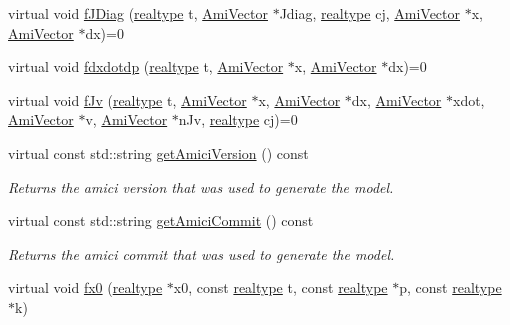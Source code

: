\begin{DoxyCompactItemize}
\item 
virtual void \mbox{\hyperlink{classamici_1_1_abstract_model_a6cf54c0a48ef223795655bdd44a339b7}{f\+J\+Diag}} (\mbox{\hyperlink{namespaceamici_a1bdce28051d6a53868f7ccbf5f2c14a3}{realtype}} t, \mbox{\hyperlink{classamici_1_1_ami_vector}{Ami\+Vector}} $\ast$Jdiag, \mbox{\hyperlink{namespaceamici_a1bdce28051d6a53868f7ccbf5f2c14a3}{realtype}} cj, \mbox{\hyperlink{classamici_1_1_ami_vector}{Ami\+Vector}} $\ast$x, \mbox{\hyperlink{classamici_1_1_ami_vector}{Ami\+Vector}} $\ast$dx)=0
\item 
virtual void \mbox{\hyperlink{classamici_1_1_abstract_model_a7ce1e14d4137c249bc44e18345b562b8}{fdxdotdp}} (\mbox{\hyperlink{namespaceamici_a1bdce28051d6a53868f7ccbf5f2c14a3}{realtype}} t, \mbox{\hyperlink{classamici_1_1_ami_vector}{Ami\+Vector}} $\ast$x, \mbox{\hyperlink{classamici_1_1_ami_vector}{Ami\+Vector}} $\ast$dx)=0
\item 
virtual void \mbox{\hyperlink{classamici_1_1_abstract_model_ae08b9d7a7d15898e4dd7c71ac057c6a5}{f\+Jv}} (\mbox{\hyperlink{namespaceamici_a1bdce28051d6a53868f7ccbf5f2c14a3}{realtype}} t, \mbox{\hyperlink{classamici_1_1_ami_vector}{Ami\+Vector}} $\ast$x, \mbox{\hyperlink{classamici_1_1_ami_vector}{Ami\+Vector}} $\ast$dx, \mbox{\hyperlink{classamici_1_1_ami_vector}{Ami\+Vector}} $\ast$xdot, \mbox{\hyperlink{classamici_1_1_ami_vector}{Ami\+Vector}} $\ast$v, \mbox{\hyperlink{classamici_1_1_ami_vector}{Ami\+Vector}} $\ast$n\+Jv, \mbox{\hyperlink{namespaceamici_a1bdce28051d6a53868f7ccbf5f2c14a3}{realtype}} cj)=0
\item 
virtual const std\+::string \mbox{\hyperlink{classamici_1_1_abstract_model_ae1d68e13dc35252f74b0a1f2601cd453}{get\+Amici\+Version}} () const
\begin{DoxyCompactList}\small\item\em Returns the amici version that was used to generate the model. \end{DoxyCompactList}\item 
virtual const std\+::string \mbox{\hyperlink{classamici_1_1_abstract_model_ab04fc6e12be695c32736b8b36d1e262d}{get\+Amici\+Commit}} () const
\begin{DoxyCompactList}\small\item\em Returns the amici commit that was used to generate the model. \end{DoxyCompactList}\item 
virtual void \mbox{\hyperlink{classamici_1_1_abstract_model_a9863c3f8901cee9620c78b3065736cf8}{fx0}} (\mbox{\hyperlink{namespaceamici_a1bdce28051d6a53868f7ccbf5f2c14a3}{realtype}} $\ast$x0, const \mbox{\hyperlink{namespaceamici_a1bdce28051d6a53868f7ccbf5f2c14a3}{realtype}} t, const \mbox{\hyperlink{namespaceamici_a1bdce28051d6a53868f7ccbf5f2c14a3}{realtype}} $\ast$p, const \mbox{\hyperlink{namespaceamici_a1bdce28051d6a53868f7ccbf5f2c14a3}{realtype}} $\ast$k)

\end{DoxyCompactItemize}
